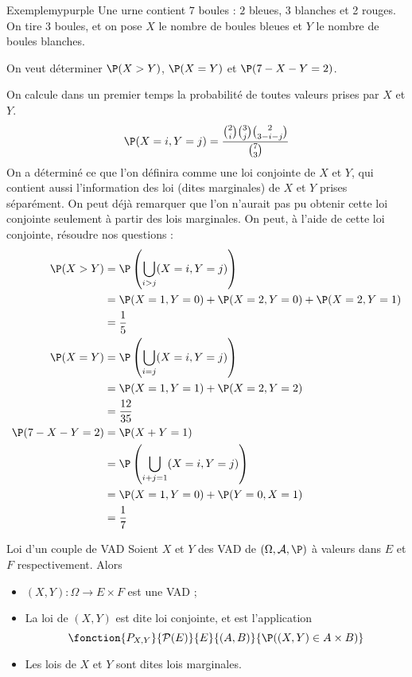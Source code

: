     \begin{omed}{Exemple}{mypurple}
        Une urne contient $7$ boules : $2$ bleues, 3 blanches et 2 rouges. On tire 3 boules, et on pose $X$ le nombre de boules bleues et $Y$ le nombre de boules blanches. 

        On veut déterminer $\P(X > Y)$, $\P(X = Y)$ et $\P(7 - X - Y = 2)$.

        On calcule dans un premier temps la probabilité de toutes valeurs prises par $X$ et $Y$.
        \[ \P(X = i, Y = j) = \frac{\binom{2}{i} \binom{3}{j} \binom{2}{3 - i - j}}{\binom{7}{3}}  \]
        On a déterminé ce que l’on définira comme une loi conjointe de $X$ et $Y$, qui contient aussi l’information des loi (dites marginales) de $X$ et $Y$ prises séparément. On peut déjà remarquer que l’on n’aurait pas pu obtenir cette loi conjointe seulement à partir des lois marginales. On peut, à l’aide de cette loi conjointe, résoudre nos questions :
        \begin{align*}
            \P(X > Y) &= \P\left(\bigcup_{i > j} (X=i, Y = j)\right) \\
            &= \P(X=1, Y=0) + \P(X = 2, Y = 0) + \P(X = 2, Y = 1) \\
            &= \frac{1}{5} \\
            \P(X = Y) &= \P\left(\bigcup_{i = j} (X = i, Y = j)\right) \\
            &= \P(X=1, Y=1) + \P(X=2,Y=2) \\
            &= \frac{12}{35} \\
            \P(7 - X - Y = 2) &= \P(X + Y = 1) \\
            &= \P\left(\bigcup_{i + j = 1} (X=i,Y=j)\right) \\
            &= \P(X=1, Y=0) + \P(Y=0,X=1) \\
            &= \frac{1}{7}
        \end{align*}
    \end{omed}

    \begin{defitheo}{Loi d’un couple de VAD}{}
        Soient $X$ et $Y$ des VAD de $(\Omega, \mathcal{A}, \P)$ à valeurs dans $E$ et $F$ respectivement. Alors 
        \begin{itemize}
            \item $(X,Y) : \Omega \to E \times F$ est une VAD ;
            \item La loi de $(X,Y)$ est dite loi conjointe, et est l’application  
            \[ \fonction{P_{X,Y}}{\mathcal{P}(E)}{E}{(A,B)}{\P((X,Y) \in A \times B)} \]
            \item Les lois de $X$ et $Y$ sont dites lois marginales.
        \end{itemize}
    \end{defitheo}

